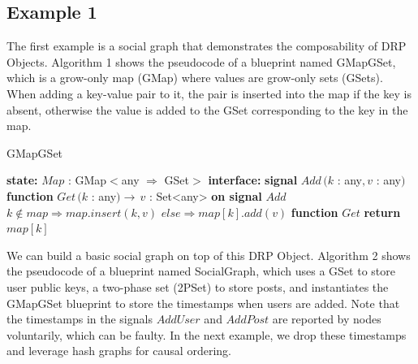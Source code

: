 \documentclass{article}
\begin{document}
\subsection{Example 1}

The first example is a social graph that demonstrates the composability of DRP Objects. Algorithm 1 shows the pseudocode of a blueprint named GMapGSet, which is a grow-only map (GMap) where values are grow-only sets (GSets). When adding a key-value pair to it, the pair is inserted into the map if the key is absent, otherwise the value is added to the GSet corresponding to the key in the map.

\begin{algorithm}
\caption{GMapGSet}
\begin{algorithmic}
\State \textbf{state:}
\State \hspace{\algorithmicindent} $Map$ : GMap$<$any $\Rightarrow$ GSet$>$
\State
\State \textbf{interface:}
\State \hspace{\algorithmicindent} \textbf{signal} $Add\,(k$ : any$,v$ : any$)$
\State \hspace{\algorithmicindent} \textbf{function} $Get\,(k$ : any$) \rightarrow\,v$ : Set<any>
\State
\State \textbf{on signal} $Add$
\State\hspace{\algorithmicindent}$k \notin map \Rightarrow map.insert (k,v)$
\State\hspace{\algorithmicindent}$else\Rightarrow map[k].add(v)$
\State
\State \textbf{function} $Get$
\State\hspace{\algorithmicindent}\textbf{return} $map[k]$
\end{algorithmic}
\end{algorithm}

We can build a basic social graph on top of this DRP Object. Algorithm 2 shows the pseudocode of a blueprint named SocialGraph, which uses a GSet to store user public keys, a two-phase set (2PSet) to store posts, and instantiates the GMapGSet blueprint to store the timestamps when users are added. Note that the timestamps in the signals $AddUser$ and $AddPost$ are reported by nodes voluntarily, which can be faulty. In the next example, we drop these timestamps and leverage hash graphs for causal ordering.
\end{document}
